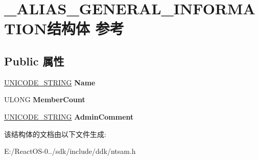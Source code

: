 \hypertarget{struct___a_l_i_a_s___g_e_n_e_r_a_l___i_n_f_o_r_m_a_t_i_o_n}{}\section{\+\_\+\+A\+L\+I\+A\+S\+\_\+\+G\+E\+N\+E\+R\+A\+L\+\_\+\+I\+N\+F\+O\+R\+M\+A\+T\+I\+O\+N结构体 参考}
\label{struct___a_l_i_a_s___g_e_n_e_r_a_l___i_n_f_o_r_m_a_t_i_o_n}
\subsection*{Public 属性}
\begin{DoxyCompactItemize}
\item 
\mbox{\label{struct___a_l_i_a_s___g_e_n_e_r_a_l___i_n_f_o_r_m_a_t_i_o_n_a81703b16cf3e8d2b0fbfcc97c453d2df}} 
\hyperlink{struct___u_n_i_c_o_d_e___s_t_r_i_n_g}{U\+N\+I\+C\+O\+D\+E\+\_\+\+S\+T\+R\+I\+NG} {\bfseries Name}
\item 
\mbox{\label{struct___a_l_i_a_s___g_e_n_e_r_a_l___i_n_f_o_r_m_a_t_i_o_n_a3003939604a1bf618ac16e4b9ca95762}} 
U\+L\+O\+NG {\bfseries Member\+Count}
\item 
\mbox{\label{struct___a_l_i_a_s___g_e_n_e_r_a_l___i_n_f_o_r_m_a_t_i_o_n_a0a130229e4eb5eba9c34a93dfa8c70db}} 
\hyperlink{struct___u_n_i_c_o_d_e___s_t_r_i_n_g}{U\+N\+I\+C\+O\+D\+E\+\_\+\+S\+T\+R\+I\+NG} {\bfseries Admin\+Comment}
\end{DoxyCompactItemize}


该结构体的文档由以下文件生成\+:\begin{DoxyCompactItemize}
\item 
E\+:/\+React\+O\+S-\/0../sdk/include/ddk/ntsam.\+h\end{DoxyCompactItemize}
